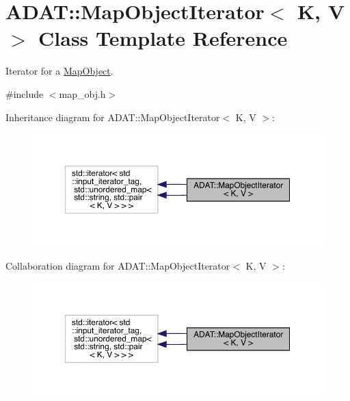 \hypertarget{classADAT_1_1MapObjectIterator}{}\section{A\+D\+AT\+:\+:Map\+Object\+Iterator$<$ K, V $>$ Class Template Reference}
\label{classADAT_1_1MapObjectIterator}


Iterator for a \mbox{\hyperlink{classADAT_1_1MapObject}{Map\+Object}}.  




{\ttfamily \#include $<$map\+\_\+obj.\+h$>$}



Inheritance diagram for A\+D\+AT\+:\+:Map\+Object\+Iterator$<$ K, V $>$\+:\nopagebreak
\begin{figure}[H]
\begin{center}
\leavevmode
\includegraphics[width=350pt]{dd/d7a/classADAT_1_1MapObjectIterator__inherit__graph}
\end{center}
\end{figure}


Collaboration diagram for A\+D\+AT\+:\+:Map\+Object\+Iterator$<$ K, V $>$\+:\nopagebreak
\begin{figure}[H]
\begin{center}
\leavevmode
\includegraphics[width=350pt]{dc/d14/classADAT_1_1MapObjectIterator__coll__graph}
\end{center}
\end{figure}
